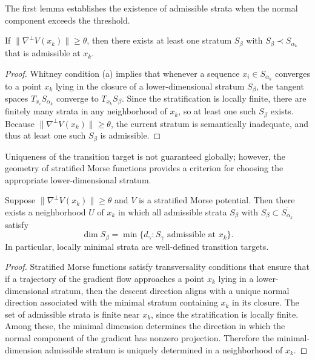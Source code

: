 \documentclass[12pt]{article}
\begin{document}
The first lemma establishes the existence of admissible strata when the normal component exceeds the threshold.

\begin{lemma}
If $\|\nabla^\perp V(x_k)\| \ge \theta$, then there exists at least one stratum $S_\beta$ with $S_\beta \prec S_{\alpha_k}$ that is admissible at $x_k$.
\end{lemma}

\begin{proof}
Whitney condition (a) implies that whenever a sequence $x_i \in S_{\alpha_k}$ converges to a point $x_k$ lying in the closure of a lower-dimensional stratum $S_\beta$, the tangent spaces $T_{x_i}S_{\alpha_k}$ converge to $T_{x_k}S_\beta$. Since the stratification is locally finite, there are finitely many strata in any neighborhood of $x_k$, so at least one such $S_\beta$ exists. Because $\|\nabla^\perp V(x_k)\| \ge \theta$, the current stratum is semantically inadequate, and thus at least one such $S_\beta$ is admissible.
\end{proof}

Uniqueness of the transition target is not guaranteed globally; however, the geometry of stratified Morse functions provides a criterion for choosing the appropriate lower-dimensional stratum.

\begin{lemma}
Suppose $\|\nabla^\perp V(x_k)\|\ge\theta$ and $V$ is a stratified Morse potential. Then there exists a neighborhood $U$ of $x_k$ in which all admissible strata $S_\beta$ with $S_\beta \subset \overline{S_{\alpha_k}}$ satisfy
\[
\dim S_\beta = \min\{ d_\gamma : S_\gamma \text{ admissible at } x_k \}.
\]
In particular, locally minimal strata are well-defined transition targets.
\end{lemma}

\begin{proof}
Stratified Morse functions satisfy transversality conditions that ensure that if a trajectory of the gradient flow approaches a point $x_k$ lying in a lower-dimensional stratum, then the descent direction aligns with a unique normal direction associated with the minimal stratum containing $x_k$ in its closure. The set of admissible strata is finite near $x_k$, since the stratification is locally finite. Among these, the minimal dimension determines the direction in which the normal component of the gradient has nonzero projection. Therefore the minimal-dimension admissible stratum is uniquely determined in a neighborhood of $x_k$.
\end{proof}
\end{document}

